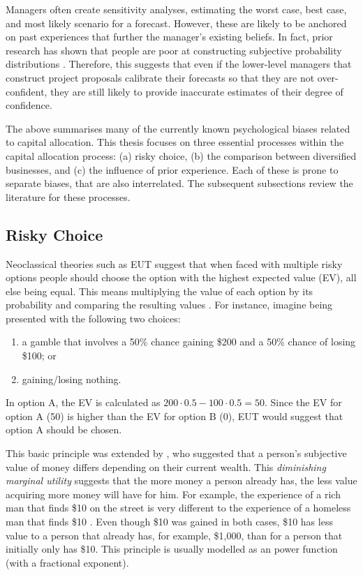 \documentclass[a4paper, nobind]{templates/ociamthesis}
\theoremstyle{definition}
\theoremstyle{definition}
\theoremstyle{definition}
\theoremstyle{definition}
\theoremstyle{remark}
\begin{document}
Managers often create sensitivity analyses, estimating the worst case, best
case, and most likely scenario for a forecast. However, these are likely to be
anchored on past experiences that further the manager's existing beliefs. In
fact, prior research has shown that people are poor at constructing subjective
probability distributions \autocites[e.g.,][]{alpert1982,schaefer1973,staelvonholstein1971,tversky1974}. Therefore, this suggests that even if the
lower-level managers that construct project proposals calibrate their forecasts
so that they are not over-confident, they are still likely to provide inaccurate
estimates of their degree of confidence.

The above summarises many of the currently known psychological biases related to
capital allocation. This thesis focuses on three essential processes within the
capital allocation process: (a) risky choice, (b) the comparison between
diversified businesses, and (c) the influence of prior experience. Each of these
is prone to separate biases, that are also interrelated. The subsequent
subsections review the literature for these processes.

\subsection{Risky Choice}

Neoclassical theories such as EUT suggest that when faced with multiple risky
options people should choose the option with the highest expected value (EV),
all else being equal. This means multiplying the value of each option by its
probability and comparing the resulting values \autocite[first documented in][]{pascal1999}. For instance, imagine being presented with the following two
choices:

\begin{enumerate}
\def\labelenumi{\Alph{enumi})}
\item
  a gamble that involves a 50\% chance gaining \$200 and a 50\% chance of losing
  \$100; or
\item
  gaining/losing nothing.
\end{enumerate}

In option A, the EV is calculated as \(200 \cdot 0.5 - 100 \cdot 0.5 = 50\). Since
the EV for option A (50) is higher than the EV for option B (0), EUT would
suggest that option A should be chosen.

This basic principle was extended by \textcite{bernoulli1954}, who suggested that a
person's subjective value of money differs depending on their current wealth.
This \emph{diminishing marginal utility} suggests that the more money a person
already has, the less value acquiring more money will have for him. For example,
the experience of a rich man that finds \$10 on the street is very different to
the experience of a homeless man that finds \$10 \autocite{bradley2013}. Even though \$10
was gained in both cases, \$10 has less value to a person that already has, for
example, \$1,000, than for a person that initially only has \$10. This principle
is usually modelled as an power function (with a fractional exponent).
\end{document}
